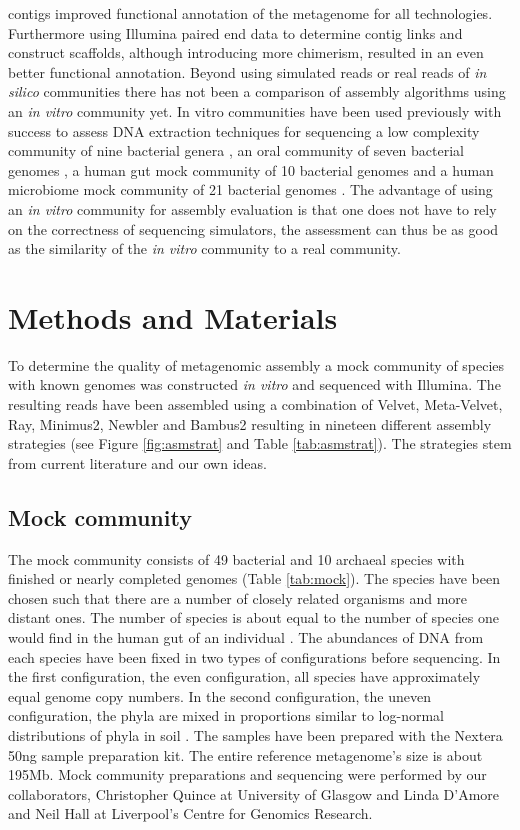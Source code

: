 \documentclass[a4paper,12pt]{report}
\begin{document}
contigs improved functional annotation of the metagenome for all technologies.
Furthermore using Illumina paired end data to determine contig links and
construct scaffolds, although introducing more chimerism, resulted in an even
better functional annotation.  Beyond using simulated reads or real reads of
{\em in silico} communities there has not been a comparison of assembly
algorithms using an {\em in vitro} community yet.  In vitro communities have
been used previously with success to assess DNA extraction techniques for
sequencing a low complexity community of nine bacterial genera
\cite{Willner22514642}, an oral community of seven bacterial genomes
\cite{Diaz22520388}, a human gut mock community of 10 bacterial genomes
\cite{Wu20673359} and a human microbiome mock community of 21 bacterial genomes
\cite{HMPC22699610}.  The advantage of using an {\em in vitro} community for
assembly evaluation is that one does not have to rely on the correctness of
sequencing simulators, the assessment can thus be as good as the similarity of
the {\em in vitro } community to a real community.


\chapter{Methods and Materials} To determine the quality of metagenomic assembly a mock
community of species with known genomes was constructed {\em in vitro} and
sequenced with Illumina. The resulting reads have been assembled using a
combination of Velvet, Meta-Velvet, Ray, Minimus2, Newbler and Bambus2 resulting in
nineteen different assembly strategies (see Figure \ref{fig:asmstrat} and Table
\ref{tab:asmstrat}). The strategies stem from current literature and our own
ideas.

\section{Mock community} The mock community consists of 49 bacterial and 10
archaeal species with finished or nearly completed genomes (Table
\ref{tab:mock}). The species have been chosen such that there are a number of
closely related organisms and more distant ones. The number of species is about
equal to the number of species one would find in the human gut of an individual
\cite{Qin20203603}. The abundances of DNA from each species have been fixed in
two types of configurations before sequencing. In the first configuration, the
even configuration, all species have approximately equal genome copy numbers.
In the second configuration, the uneven configuration, the phyla are mixed in
proportions similar to log-normal distributions of phyla in soil
\cite{Doroghazi18682841}. The samples have been prepared with the Nextera 50ng
sample preparation kit. The entire reference metagenome's size is about 195Mb.
Mock community preparations and sequencing were performed by our collaborators,
Christopher Quince at University of Glasgow and Linda D'Amore and Neil Hall at
Liverpool's Centre for Genomics Research.
\end{document}
